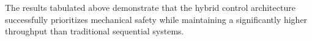 
The results tabulated above demonstrate that the hybrid control architecture successfully prioritizes mechanical safety while maintaining a significantly higher throughput than traditional sequential systems.

\clearpage